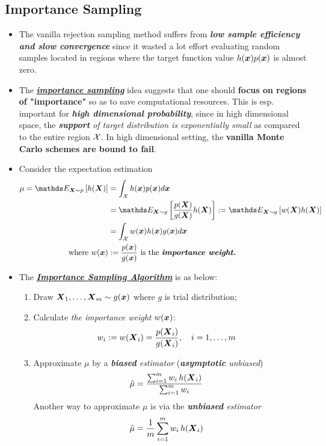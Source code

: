 \documentclass[11pt]{article}
\begin{document}
\subsection{Importance Sampling}
\begin{itemize}
\item The vanilla rejection sampling method suffers from \emph{\textbf{low sample efficiency and slow convergence}} since it wasted a lot effort evaluating random samples located in regions where the target function value $h(\boldsymbol{x})p(\boldsymbol{x})$ is almost zero. 

\item The \underline{\emph{\textbf{importance sampling}}} idea suggests that one should \textbf{focus on regions of "importance"} so as to save computational resources. This is esp. important for \emph{\textbf{high dimensional probability}}, since in high dimensional space, the \emph{\textbf{support} of target distribution is exponentially small} as compared to the entire region ${\mathcal X}$. In high dimensional setting, the \textbf{vanilla Monte Carlo schemes are bound to fail}.

\item Consider the expectation estimation
\begin{align}
\mu = \E{\mb{X}\sim p}{h(\mb{X})} &= \int_{\cX}h(\mb{x})p(\mb{x}) d\mb{x} \nonumber\\
&=\E{\mb{X}\sim g}{\frac{p(\mb{X})}{g(\mb{X})}h(\mb{X})} := \E{\mb{X}\sim g}{w(\mb{X})h(\mb{X})} \label{eqn: importance_sampling}\\
&= \int_{\cX} w(\mb{x})h(\mb{x})g(\mb{x}) d\mb{x} \nonumber\\
\text{where }w(\mb{x}) &:= \frac{p(\mb{x})}{g(\mb{x})} \text{ is the \emph{\textbf{importance weight.}}} \nonumber
\end{align}

\item The \underline{\emph{\textbf{Importance Sampling Algorithm}}} \citep{liu2001monte, robert1999monte} is as below:
\begin{enumerate}
\item Draw $\boldsymbol{X}_1, \ldots, \boldsymbol{X}_{m} \sim g(\boldsymbol{x})$ where $g$ is trial distribution;
\item Calculate \emph{the importance weight} $w(\boldsymbol{x})$: 
\begin{align*}
w_i := w(\boldsymbol{X}_i) &= \frac{p(\boldsymbol{X}_i)}{g(\boldsymbol{X}_i)}, \quad i=1,\ldots, m
\end{align*}
\item Approximate $\mu$ by a \emph{\textbf{biased} estimator} (\emph{\textbf{asymptotic} unbiased})
\begin{align}
\hat{\mu} &= \frac{\sum_{i=1}^{m}w_i\,h(\boldsymbol{X}_i)}{\sum_{i=1}^{m}w_i} \label{eqn: importance_sampling_estimate}
\end{align}
Another way to approximate $\mu$ is via the \emph{\textbf{unbiased} estimator}
\begin{align}
\hat{\mu} &= \frac{1}{m}\sum_{i=1}^{m}w_i\,h(\boldsymbol{X}_i) \label{eqn: importance_sampling_estimate2}
\end{align}
\end{enumerate}


\end{itemize}
\end{document}
